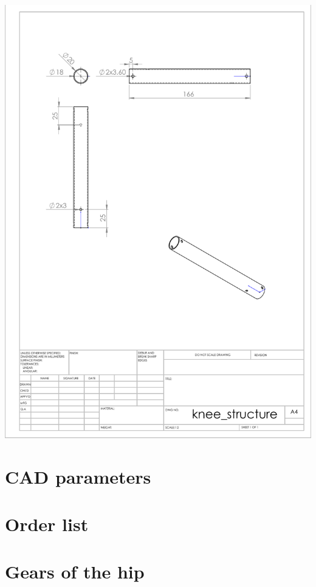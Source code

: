 \begin{appendices}
        \includegraphics[width=\linewidth]{chapters/cha_appendices/knee_structure}

    \section{CAD parameters}
    \label{app:cad_parameters}
        

    \section{Order list}
    \label{app:order_list}
        

    \section{Gears of the hip}
    \label{app:hip_gears}
        
\end{appendices}